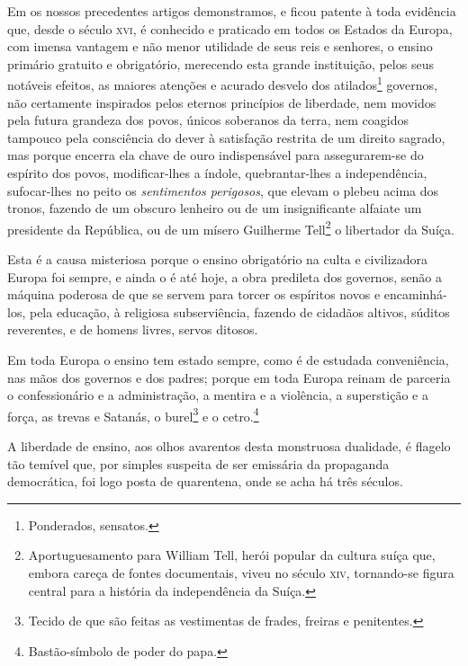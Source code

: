 Em os nossos precedentes artigos demonstramos, e ficou patente à toda
evidência que, desde o século \textsc{xvi}, é conhecido e praticado em todos os
Estados da Europa, com imensa vantagem e não menor utilidade de seus
reis e senhores, o ensino primário gratuito e obrigatório, merecendo
esta grande instituição, pelos seus notáveis efeitos, as maiores
atenções e acurado desvelo dos atilados\footnote{Ponderados, sensatos.}
governos, não certamente inspirados pelos eternos princípios de
liberdade, nem movidos pela futura grandeza dos povos, únicos soberanos
da terra, nem coagidos tampouco pela consciência do dever à satisfação
restrita de um direito sagrado, mas porque encerra ela chave de ouro
indispensável para assegurarem-se do espírito dos povos, modificar-lhes
a índole, quebrantar-lhes a independência, sufocar-lhes no peito os
\emph{sentimentos perigosos}, que elevam o plebeu acima dos tronos,
fazendo de um obscuro lenheiro ou de um insignificante alfaiate um
presidente da República, ou de um mísero Guilherme Tell\footnote{
  Aportuguesamento para William Tell, herói popular da cultura suíça
  que, embora careça de fontes documentais, viveu no século \textsc{xiv},
  tornando-se figura central para a história da independência da Suíça.}
o libertador da Suíça.

Esta é a causa misteriosa porque o ensino obrigatório na culta e
civilizadora Europa foi sempre, e ainda o é até hoje, a obra predileta
dos governos, senão a máquina poderosa de que se servem para torcer os
espíritos novos e encaminhá-los, pela educação, à religiosa
subserviência, fazendo de cidadãos altivos, súditos reverentes, e de
homens livres, servos ditosos.

Em toda Europa o ensino tem estado sempre, como é de estudada
conveniência, nas mãos dos governos e dos padres; porque em toda Europa
reinam de parceria o confessionário e a administração, a mentira e a
violência, a superstição e a força, as trevas e Satanás, o
burel\footnote{Tecido de que são feitas as vestimentas de frades,
  freiras e penitentes.} e o cetro.\footnote{Bastão-símbolo de poder do
  papa.}

A liberdade de ensino, aos olhos avarentos desta monstruosa dualidade, é
flagelo tão temível que, por simples suspeita de ser emissária da
propaganda democrática, foi logo posta de quarentena, onde se acha há
três séculos.

